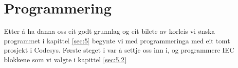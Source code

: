 \chapter{Programmering}
\thispagestyle{fancy}
Etter å ha danna oss eit godt grunnlag og eit bilete av korleis vi ønska programmet i kapittel \ref{sec:5} 
begynte vi med programmeringa med eit tomt prosjekt i \gls{Codesys}. Første steget i var å 
settje oss inn i, og programmere \gls{IEC} blokkene som vi valgte i kapittel \ref{sec:5.2}


